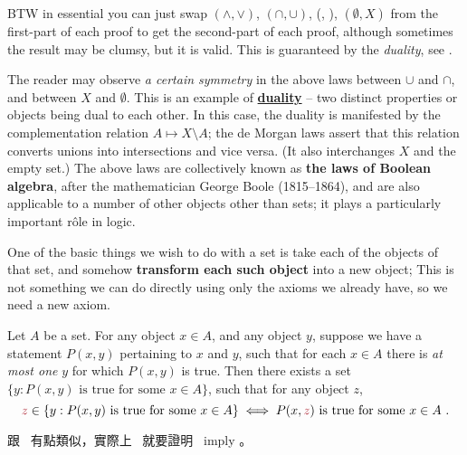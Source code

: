 \begin{note}
BTW in essential you can just swap \((\land, \lor)\), \((\cap, \cup)\), (, ), \((\emptyset, X)\) from the first-part of each proof to get the second-part of each proof, although sometimes the result may be clumsy, but it is valid. This is guaranteed by the \emph{duality}, see .
\end{note}

\begin{remark} \label{remark 3.1.30}
The reader may observe \emph{a certain symmetry} in the above laws between \(\cup\) and \(\cap\), and between \(X\) and \(\emptyset\). This is an example of \href{https://www.wikiwand.com/en/Duality_(mathematics)}{\textbf{duality}} -- two distinct properties or objects being dual to each other. In this case, the duality is manifested by the complementation relation \(A \mapsto X \setminus A \); the de Morgan laws assert that this relation converts unions into intersections and vice versa. (It also interchanges \(X\) and the empty set.) The above laws are collectively known as \textbf{the laws of Boolean algebra}, after the mathematician George Boole (1815–1864), and are also applicable to a number of other objects other than sets; it plays a
particularly important r\^{o}le in logic.
\end{remark}

\begin{note}
One of the basic things we wish to do with a set is take each of the objects of that set, and somehow \textbf{transform each such object} into a new object; This is not something we can do directly using only the axioms we already have, so we need a new axiom.
\end{note}

\begin{axiom} [Replacement] \label{axm 3.6}
Let \(A\) be a set. For any object \(x \in A\), and any object \(y\), suppose we have a statement \(P(x, y)\) pertaining to \(x\) and \(y\), such that for each \(x \in A\) there is \emph{at most one} \(y\) for which \(P(x, y)\) is true. Then there exists a set \( \{y : P(x, y) \text{\ is true for some\ } x \in A \} \), such that for any object \(z\),
\[
\MAROON{z} \in \{ y : P(x, y) \text{\ is true for some\ } x \in A \} \iff P(x, \MAROON{z}) \text{\ is true for some \(x \in A\) }.
\]
\end{axiom}

\begin{note}
 跟\  有點類似，實際上\  就要證明\  imply 。
\end{note}

